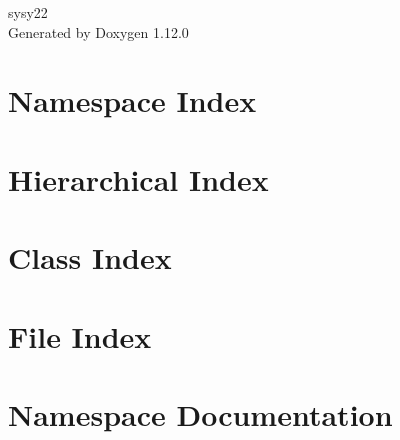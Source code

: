 \documentclass[twoside]{book}
\newcommand{\+}{\discretionary{\mbox{\scriptsize$\hookleftarrow$}}{}{}}
\newcommand{\clearemptydoublepage}{%
    \newpage{\pagestyle{empty}\cleardoublepage}%
  }
\begin{document}
  \raggedbottom
    \hypersetup{pageanchor=false,
                bookmarksnumbered=true,
                pdfencoding=unicode
               }
  \begin{titlepage}
  \vspace*{7cm}
  \begin{center}%
  {\Large sysy22}\\
  \vspace*{1cm}
  {\large Generated by Doxygen 1.12.0}\\
  \end{center}
  \end{titlepage}
  \clearemptydoublepage
  \tableofcontents
  \clearemptydoublepage
  \hypersetup{pageanchor=true}
\chapter{Namespace Index}

\chapter{Hierarchical Index}

\chapter{Class Index}

\chapter{File Index}

\chapter{Namespace Documentation}








\end{document}
